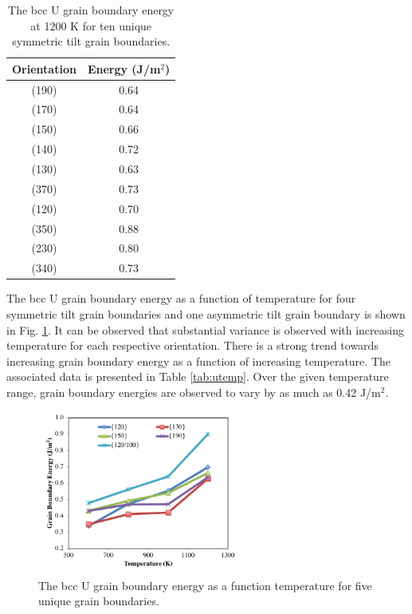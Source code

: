 \documentclass[review]{elsarticle}
\begin{document}
\begin{table}[h]
\caption{The bcc U grain boundary energy at 1200 K for ten unique symmetric tilt grain boundaries.} \label{tab:u1200}
\begin{center}
\begin{tabular}{|c|c|}
	\hline
	Orientation & Energy (J/m$^{2}$) \\
	 \hline
	 (190) & 0.64 \\
	 (170) & 0.64 \\
	 (150) & 0.66 \\
	 (140) & 0.72 \\
	 (130) & 0.63 \\	 
	 (370) & 0.73 \\
	 (120) & 0.70 \\
	 (350) & 0.88 \\
	 (230) & 0.80 \\
	 (340) & 0.73 \\
	 \hline
\end{tabular}
\end{center}
\label{default}
\end{table}

\FloatBarrier

The bcc U grain boundary energy as a function of temperature for four symmetric tilt grain boundaries and one asymmetric tilt grain boundary is shown in Fig. \ref{fig:utemp}. It can be observed that substantial variance is observed with increasing temperature for each respective orientation. There is a strong trend towards increasing grain boundary energy as a function of increasing temperature. The associated data is presented in Table \ref{tab:utemp}. Over the given temperature range, grain boundary energies are observed to vary by as much as 0.42 J/m$^{2}$. 

\begin{figure}[h]
 \centering
 \includegraphics[width=0.6\textwidth]{u_temp.png} 
 \caption{The bcc U grain boundary energy as a function temperature for five unique grain boundaries.}
 \label{fig:utemp}
\end{figure}
\end{document}
